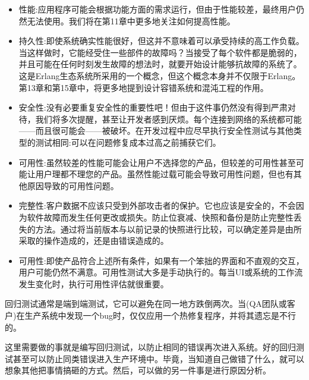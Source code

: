 \begin{itemize}
\item 
性能:应用程序可能会根据功能方面的需求运行，但由于性能较差，最终用户仍然无法使用。我们将在第11章中更多地关注如何提高性能。

\item 
持久性:即使系统确实性能很好，但这并不意味着可以承受持续的高工作负载。当这样做时，它能经受住一些部件的故障吗？当接受了每个软件都是脆弱的，并且可能在任何时刻发生故障的想法时，就要开始设计能够抗故障的系统了。这是Erlang生态系统所采用的一个概念，但这个概念本身并不仅限于Erlang。第13章和第15章中，将更多地提到设计容错系统和混沌工程的作用。

\item 
安全性:没有必要重复安全性的重要性吧！但由于这件事仍然没有得到严肃对待，我们将多次提醒，甚至让开发者感到厌烦。每个连接到网络的系统都可能——而且很可能会——被破坏。在开发过程中应尽早执行安全性测试与其他类型的测试相同:可以在问题修复成本过高之前捕获它们。

\item 
可用性:虽然较差的性能可能会让用户不选择您的产品，但较差的可用性甚至可能让用户理都不理您的产品。虽然性能过载可能会导致可用性问题，但也有其他原因导致的可用性问题。

\item 
完整性:客户数据不应该只受到外部攻击者的保护。它也应该是安全的，不会因为软件故障而发生任何更改或损失。防止位衰减、快照和备份是防止完整性丢失的方法。通过将当前版本与以前记录的快照进行比较，可以确定差异是由所采取的操作造成的，还是由错误造成的。

\item 
可用性:即使产品符合上述所有条件，如果有一个笨拙的界面和不直观的交互，用户可能仍然不满意。可用性测试大多是手动执行的。每当UI或系统的工作流发生变化时，执行可用性评估就很重要。
\end{itemize}


回归测试通常是端到端测试，它可以避免在同一地方跌倒两次。当(QA团队或客户)在生产系统中发现一个bug时，仅仅应用一个热修复程序，并将其遗忘是不行的。

这里需要做的事就是编写回归测试，以防止相同的错误再次进入系统。好的回归测试甚至可以防止同类错误进入生产环境中。毕竟，当知道自己做错了什么，就可以想象其他把事情搞砸的方式。然后，可以做的另一件事是进行原因分析。


